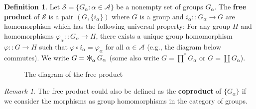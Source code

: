 \documentclass[a4paper,titlepage]{article}
\theoremstyle{remark}
\newtheorem*{remark}{Remark}
\theoremstyle{definition}
\theoremstyle{definition}
\newtheorem{definition}{Definition}
\theoremstyle{plain}
\DeclareMathOperator*{\freeprod}{\raisebox{-0.4ex}{\scalebox{2}{$\ast$}}\!}
\begin{document}
  \begin{definition}
    Let $\mathcal{S} = \{ G_\alpha : \alpha \in \mathcal{A} \}$ be a nonempty set of groups $G_{\alpha}$.
    The {\bf free product} of $\mathcal{S}$ is a pair $(G, \{i_\alpha\})$ where $G$ is a group
    and $i_{\alpha} :: G_\alpha \to G$ are homomorphism which has the following universal property:
    For any group $H$ and homomorphisms $\varphi_\alpha :: G_\alpha \to H$, 
    there exists a unique group homomorphism $\varphi :: G \to H$ such that $\varphi \circ i_\alpha = \varphi_\alpha$ for
    all $\alpha \in \mathcal{A}$ (e.g., the diagram below commutes).
    We write $G = \freeprod_\alpha G_\alpha$ (some also write
    $G = \prod^* G_\alpha$ or $G = \coprod G_\alpha$).
  \end{definition}

  \begin{figure}[h]
    \centering
    \caption{The diagram of the free product}
  \end{figure}

  \begin{remark}
    The free product could also be defined as the {\bf coproduct} of $\{ G_\alpha \}$ if we consider the morphisms
    as group homomorphisms in the category of groups.
  \end{remark}
\end{document}
